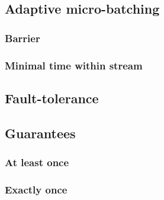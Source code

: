 \subsection{Adaptive micro-batching}

\subsubsection{Barrier}

\subsubsection{Minimal time within stream}

\subsection{Fault-tolerance}

\subsection{Guarantees}

\subsubsection{At least once}

\subsubsection{Exactly once}



